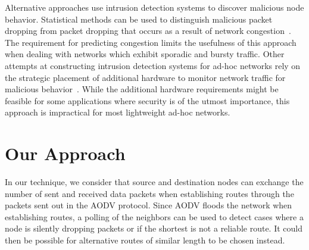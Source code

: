 \documentclass[12pt,a4paper]{report}
\begin{document}
Alternative approaches use intrusion detection systems to discover malicious node behavior. Statistical methods can be used to distinguish malicious packet dropping from packet dropping that occurs as a result of network congestion~\cite{1258776}. The requirement for predicting congestion limits the usefulness of this approach when dealing with networks which exhibit sporadic and bursty traffic. Other attempts at constructing intrusion detection systems for ad-hoc networks rely on the strategic placement of additional hardware to monitor network traffic for malicious behavior~\cite{Tseng:2003:SID:986858.986876}. While the additional hardware requirements might be feasible for some applications where security is of the utmost importance, this approach is impractical for most lightweight ad-hoc networks.

\section{Our Approach}
In our technique, we consider that source and destination nodes can exchange the number of sent and received data packets when establishing routes through the packets sent out in the AODV protocol. Since AODV floods the network when establishing routes, a polling of the neighbors can be used to detect cases where a node is silently dropping packets or if the shortest is not a reliable route.  It could then be possible for alternative routes of similar length to be chosen instead.



\end{document}
